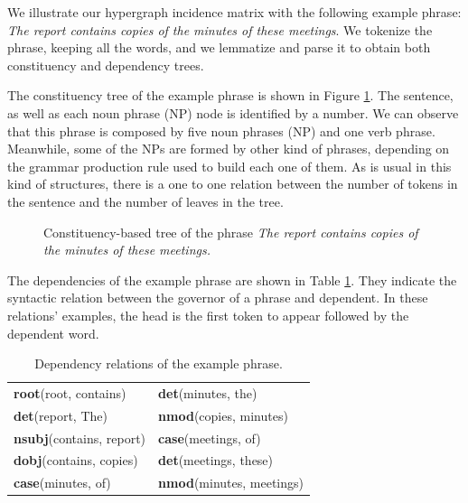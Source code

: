 We illustrate our hypergraph incidence matrix with the following example  phrase: \textit{The report contains copies of the minutes of these meetings}. We tokenize the phrase, keeping all the words, and we lemmatize and parse it to obtain both constituency and dependency trees.

 The constituency tree of the example phrase is shown in Figure \ref{fig:tree}. The sentence, as well as each noun phrase (NP) node is identified by a number. We can observe that this phrase is composed by five noun phrases (NP) and one verb phrase. Meanwhile, some of the NPs are formed by other kind of phrases, depending on the grammar production rule used to build each one of them. As is usual in this kind of structures, there is a one to one relation between the number of tokens in the sentence  and the number of leaves in the tree.
 
 
 \begin{figure}[t]
 \centering
 \caption{Constituency-based tree of the phrase \textit{The report contains copies of the minutes of these meetings.}
 }
 \label{fig:tree}
 \end{figure}
 
 The dependencies of the example phrase are shown in Table \ref{tab:depends}.  They indicate the syntactic relation between the	  governor of a phrase and  dependent. In these relations' examples, the head is the first token to appear  followed by the dependent word.
 
 \begin{table}[]
 \centering
 \caption{Dependency relations of the example phrase.}
 \label{tab:depends}
 \begin{tabular}{l|l}
 \textbf{root}(root, contains)    & \textbf{det}(minutes, the)       \\
 \textbf{det}(report, The)        & \textbf{nmod}(copies, minutes)   \\
 \textbf{nsubj}(contains, report) & \textbf{case}(meetings, of)      \\
 \textbf{dobj}(contains, copies)  & \textbf{det}(meetings, these)    \\
 \textbf{case}(minutes, of)       & \textbf{nmod}(minutes, meetings)
 \end{tabular}
 \end{table}
 
